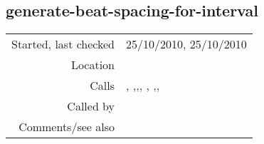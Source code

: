 \subsection*{generate-beat-spacing-for-interval}\label{fun:generate-beat-spacing-for-interval}

\vspace{0.3cm}
\begin{tabular}{r|p{8cm}}
Started, last checked & 25/10/2010, 25/10/2010 \\
Location & \nameref{sec:generating-with-patterns} \\
Calls & \nameref{fun:beat-spacing-states}, \nameref{fun:beat-spacing-states<-},\newline \nameref{fun:generate-beat-spacing-forced<->},\newline \nameref{fun:most-plausible-join}, \nameref{fun:my-last}, \nameref{fun:nth-list-of-lists},\newline \nameref{fun:remove-datapoints-with-nth-item<},\newline \nameref{fun:remove-datapoints-with-nth-item>} \\
Called by & \nameref{fun:generate-beat-spacing-for-intervals} \\
Comments/see also &
\end{tabular}


